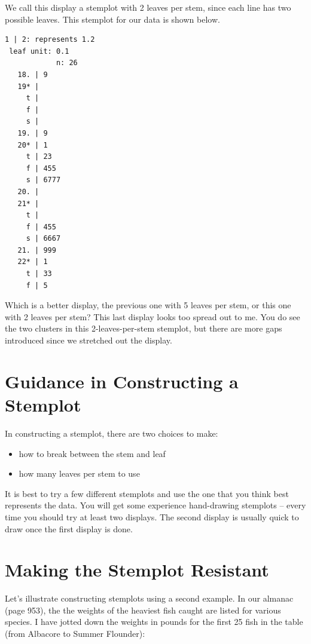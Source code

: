 \documentclass[
]{book}
\providecommand{\tightlist}{%
  \setlength{\itemsep}{0pt}\setlength{\parskip}{0pt}}
\begin{document}
We call this display a stemplot with 2 leaves per stem, since each line has two possible leaves. This stemplot for our data is shown below.

\begin{verbatim}
1 | 2: represents 1.2
 leaf unit: 0.1
            n: 26
   18. | 9
   19* | 
     t | 
     f | 
     s | 
   19. | 9
   20* | 1
     t | 23
     f | 455
     s | 6777
   20. | 
   21* | 
     t | 
     f | 455
     s | 6667
   21. | 999
   22* | 1
     t | 33
     f | 5
\end{verbatim}

Which is a better display, the previous one with 5 leaves per stem, or this one with 2 leaves per stem? This last display looks too spread out to me. You do see the two clusters in this 2-leaves-per-stem stemplot, but there are more gaps introduced since we stretched out the display.

\hypertarget{guidance-in-constructing-a-stemplot}{%
\section{Guidance in Constructing a Stemplot}\label{guidance-in-constructing-a-stemplot}}

In constructing a stemplot, there are two choices to make:

\begin{itemize}
\tightlist
\item
  how to break between the stem and leaf
\item
  how many leaves per stem to use
\end{itemize}

It is best to try a few different stemplots and use the one that you think best represents the data. You will get some experience hand-drawing stemplots -- every time you should try at least two displays. The second display is usually quick to draw once the first display is done.

\hypertarget{making-the-stemplot-resistant}{%
\section{Making the Stemplot Resistant}\label{making-the-stemplot-resistant}}

Let's illustrate constructing stemplots using a second example. In our almanac (page 953), the the weights of the heaviest fish caught are listed for various species. I have jotted down the weights in pounds for the first 25 fish in the table (from Albacore to Summer Flounder):
\end{document}
